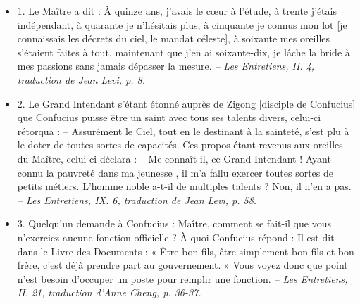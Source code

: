 \begin{itemize}

     \item  1. \newline Le Maître a dit : À quinze ans, j’avais le cœur à l’étude, à trente j’étais indépendant, à quarante je n’hésitais plus, à cinquante je connus mon lot [je connaissais les décrets du ciel, le mandat céleste], à soixante mes oreilles s’étaient faites à tout, maintenant que j’en ai soixante-dix, je lâche la bride à mes passions sans jamais dépasser la mesure.   \textit{\small -- Les Entretiens, II. 4, traduction de Jean Levi, p. 8.  } 
\item 2. \newline Le Grand Intendant s’étant étonné auprès de Zigong [disciple de Confucius] que Confucius puisse être un saint avec tous ses talents divers, celui-ci rétorqua :  -- Assurément le Ciel, tout en le destinant à la sainteté, s’est plu à le doter de toutes sortes de capacités. Ces propos étant revenus aux oreilles du Maître, celui-ci déclara :  \newline -- Me connaît-il, ce Grand Intendant ! Ayant connu la pauvreté dans ma jeunesse , il m’a fallu exercer toutes sortes de petits métiers. L’homme noble a-t-il de multiples talents ? Non, il n’en a pas.  \textit{\small -- Les Entretiens, IX. 6, traduction de Jean Levi, p. 58.  }
\item 3. \newline Quelqu’un demande à Confucius : Maître, comment se fait-il que vous n’exerciez aucune fonction officielle ?  À quoi Confucius répond :  Il est dit dans le Livre des Documents : « Être bon fils, être simplement bon fils et bon frère, c’est déjà prendre part au gouvernement. » Vous voyez donc que point n’est besoin d’occuper un poste pour remplir une fonction.  \textit{\small -- Les Entretiens, II. 21, traduction d’Anne Cheng, p. 36-37.  
}

\end{itemize}
